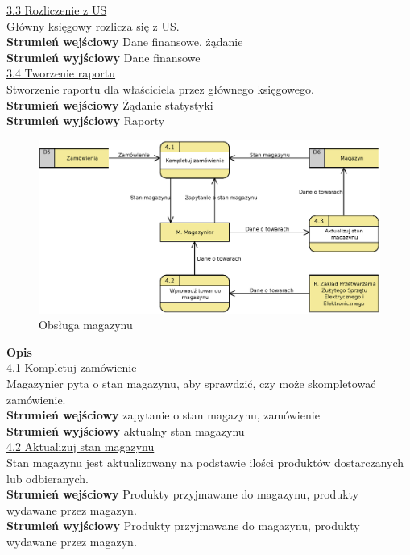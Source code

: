 	\underline{3.3 Rozliczenie z US}\\
	Główny księgowy rozlicza się z US. \\
	\textbf{Strumień wejściowy} Dane finansowe, żądanie\\
	\textbf{Strumień wyjściowy} Dane finansowe \\

	\underline{3.4 Tworzenie raportu}\\
	Stworzenie raportu dla właściciela przez głównego księgowego. \\
	\textbf{Strumień wejściowy} Żądanie statystyki\\
	\textbf{Strumień wyjściowy} Raporty \\

	\begin{figure}[H]
		\centering
		\centerline{\includegraphics[width=1.1\textwidth]{img/DFD/2-level-magazyn.eps}}
		\caption{Obsługa magazynu}
	\end{figure}

	\textbf{Opis} \\
	\underline{4.1 Kompletuj zamówienie}\\
	Magazynier pyta o stan magazynu, aby sprawdzić, czy może skompletować zamówienie. \\
	\textbf{Strumień wejściowy} zapytanie o stan magazynu, zamówienie\\
	\textbf{Strumień wyjściowy} aktualny stan magazynu\\

	\underline{4.2 Aktualizuj stan magazynu}\\ 
	Stan magazynu jest aktualizowany na podstawie ilości produktów dostarczanych lub odbieranych.\\	
	\textbf{Strumień wejściowy} Produkty przyjmawane do magazynu, produkty wydawane przez magazyn.\\
	\textbf{Strumień wyjściowy} Produkty przyjmawane do magazynu, produkty wydawane przez magazyn.\\
	
